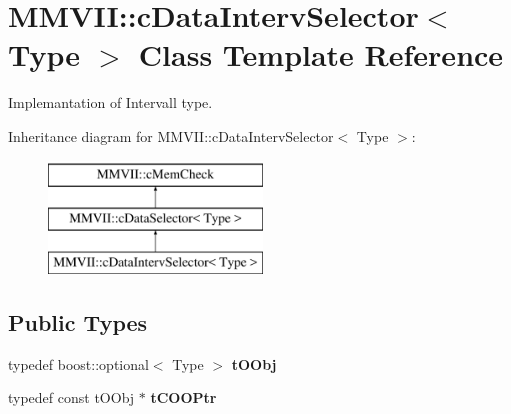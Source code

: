 \hypertarget{classMMVII_1_1cDataIntervSelector}{}\section{M\+M\+V\+II\+:\+:c\+Data\+Interv\+Selector$<$ Type $>$ Class Template Reference}
\label{classMMVII_1_1cDataIntervSelector}


Implemantation of Intervall type.  


Inheritance diagram for M\+M\+V\+II\+:\+:c\+Data\+Interv\+Selector$<$ Type $>$\+:\begin{figure}[H]
\begin{center}
\leavevmode
\includegraphics[height=3.000000cm]{classMMVII_1_1cDataIntervSelector}
\end{center}
\end{figure}
\subsection*{Public Types}
\begin{DoxyCompactItemize}
\item 
typedef boost\+::optional$<$ Type $>$ {\bfseries t\+O\+Obj}\hypertarget{classMMVII_1_1cDataIntervSelector_a88648567b60f951477298817db7cca65}{}\label{classMMVII_1_1cDataIntervSelector_a88648567b60f951477298817db7cca65}

\item 
typedef const t\+O\+Obj $\ast$ {\bfseries t\+C\+O\+O\+Ptr}\hypertarget{classMMVII_1_1cDataIntervSelector_af19d3c4d2a6f49c777d88b595e7ca181}{}\label{classMMVII_1_1cDataIntervSelector_af19d3c4d2a6f49c777d88b595e7ca181}

\end{DoxyCompactItemize}
